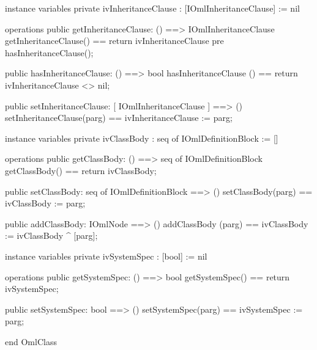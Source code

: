 \begin{vdm_al}
instance variables
  private ivInheritanceClause : [IOmlInheritanceClause] := nil

operations
  public getInheritanceClause: () ==> IOmlInheritanceClause
  getInheritanceClause() == return ivInheritanceClause
    pre hasInheritanceClause();

  public hasInheritanceClause: () ==> bool
  hasInheritanceClause () == return ivInheritanceClause <> nil;

  public setInheritanceClause: [ IOmlInheritanceClause ] ==> ()
  setInheritanceClause(parg) == ivInheritanceClause := parg;

instance variables
  private ivClassBody : seq of IOmlDefinitionBlock := []

operations
  public getClassBody: () ==> seq of IOmlDefinitionBlock
  getClassBody() == return ivClassBody;

  public setClassBody: seq of IOmlDefinitionBlock ==> ()
  setClassBody(parg) == ivClassBody := parg;

  public addClassBody: IOmlNode ==> ()
  addClassBody (parg) == ivClassBody := ivClassBody ^ [parg];

instance variables
  private ivSystemSpec : [bool] := nil

operations
  public getSystemSpec: () ==> bool
  getSystemSpec() == return ivSystemSpec;

  public setSystemSpec: bool ==> ()
  setSystemSpec(parg) == ivSystemSpec := parg;

end OmlClass
\end{vdm_al}

